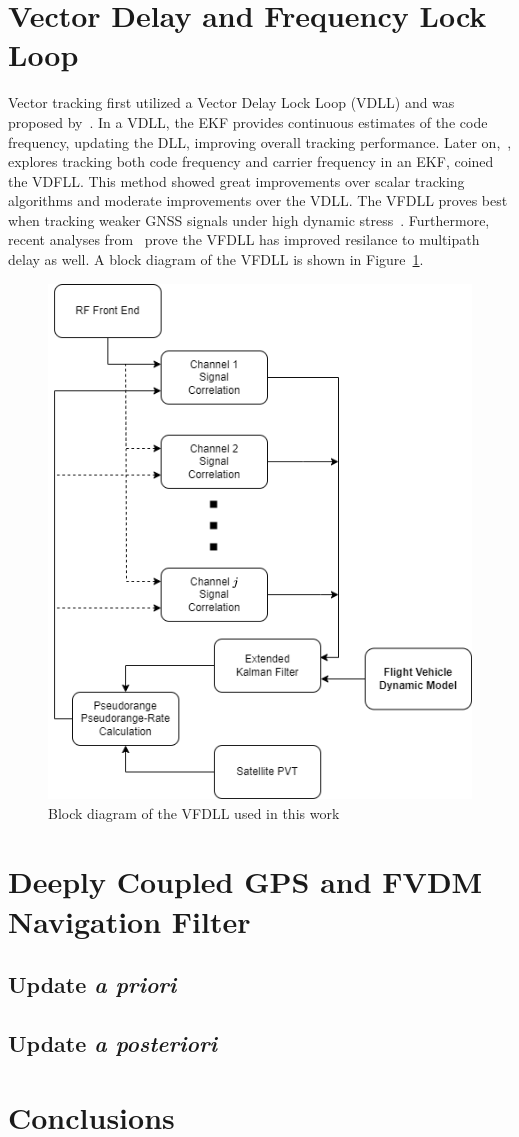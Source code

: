 \section{Vector Delay and Frequency Lock Loop}
Vector tracking first utilized a Vector Delay Lock Loop (VDLL) and was proposed by~\cite{}. In a VDLL, the EKF provides continuous estimates of the code frequency, updating the DLL, improving overall tracking performance. Later on,~\cite{}, explores tracking both code frequency and carrier frequency in an EKF, coined the VDFLL. This method showed great improvements over scalar tracking algorithms and moderate improvements over the VDLL. The VFDLL proves best when tracking weaker GNSS signals under high dynamic stress~\cite{}. Furthermore, recent analyses from~\cite{} prove the VFDLL has improved resilance to multipath delay as well. A block diagram of the VFDLL is shown in Figure~\ref{fig:VFDLL}.

\begin{figure}[!ht]
    \centering
    \includegraphics[width=0.45\linewidth]{Figures/VectorTracking.drawio.png}
    \caption{Block diagram of the VFDLL used in this work}\label{fig:VFDLL}
\end{figure}
\clearpage
\section{Deeply Coupled GPS and FVDM Navigation Filter}
\subsection{Update \textit{a priori}}
\subsection{Update \textit{a posteriori}}

\section{Conclusions}